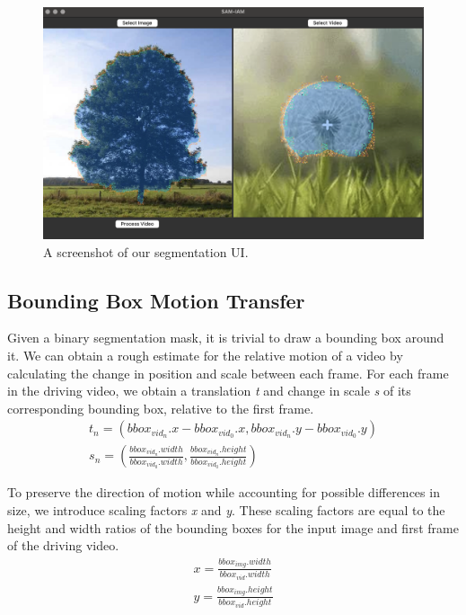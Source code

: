 \begin{figure}[t]
    \centering
    \includegraphics[width=1\linewidth]{media/ui.png}
    \caption{A screenshot of our segmentation UI.}
    \label{fig:ui}
\end{figure}

\subsection{Bounding Box Motion Transfer}


Given a binary segmentation mask, it is trivial to draw a bounding box around it. We can obtain a rough estimate for the relative motion of a video by calculating the change in position and scale between each frame.
For each frame in the driving video, we obtain a translation \textit{t} and change in scale \textit{s} of its corresponding bounding box, relative to the first frame.
\begin{equation}
    \begin{gathered}
        t_{n} = (bbox_{vid_n}.x-bbox_{vid_0}.x, bbox_{vid_n}.y-bbox_{vid_0}.y) \\
        s_{n} = (\frac{bbox_{vid_n}.width}{bbox_{vid_0}.width},\frac{bbox_{vid_n}.height}{bbox_{vid_0}.height})
    \end{gathered}
    \label{eq:transformation}
\end{equation}

To preserve the direction of motion while accounting for possible differences in size, we introduce scaling factors \textit{x} and \textit{y}.
These scaling factors are equal to the height and width ratios of the bounding boxes for the input image and first frame of the driving video.
\begin{equation}
    \begin{gathered}
        x = \frac{bbox_{img}.width}{bbox_{vid}.width} \\ y = \frac{bbox_{img}.height}{bbox_{vid}.height}
    \end{gathered}
    \label{eq:scaling}
\end{equation}

